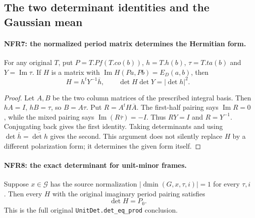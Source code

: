 \subsection{The two determinant identities and the Gaussian mean}

\paragraph{NFR7: the normalized period matrix determines the Hermitian form.}
\label{claim:NFR7}
For any original $T$, put $P=T.Pf(T.co(b))$, $h=T.h(b)$,
$\tau=T.ta(b)$ and $Y=\operatorname{Im}\tau$.
If $H$ is a matrix with
$\operatorname{Im}H(Pa,Pb)=E_D(a,b)$, then
\[
 H=h^tY^{-1}\overline h,
 \qquad \det H\det Y=|\det h|^2.
 \tag{NFR.15}
\]

\begin{proof}
Let $A,B$ be the two column matrices of the prescribed integral
basis.  Then $hA=I$, $hB=\tau$, so $B=A\tau$.
Put $R=A^tH\overline A$.  The first-half pairing says
$\operatorname{Im}R=0$, while the mixed pairing says
$\operatorname{Im}(R\overline\tau)=-I$.
Thus $RY=I$ and $R=Y^{-1}$.  Conjugating back gives the first
identity.  Taking determinants and using
$\det\overline h=\overline{\det h}$ gives the second.
This argument does not silently replace $H$ by a different
polarization form; it determines the given form itself.
\end{proof}

\paragraph{NFR8: the exact determinant for unit-minor frames.}
\label{claim:NFR8}
Suppose $x\in\mathcal G$ has the source normalization
$|\operatorname{dmin}(G,x,\tau,i)|=1$ for every $\tau,i$.
Then every $H$ with the original imaginary period pairing satisfies
\[
                     \det H=P_0.                     \tag{NFR.16}
\]
This is the full original \texttt{UnitDet.det\_eq\_prod} conclusion.

